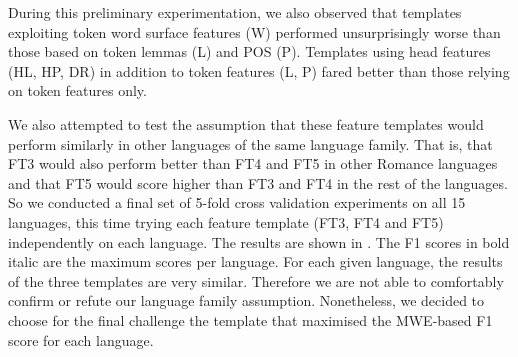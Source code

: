 \documentclass[output=paper,modfonts,nonflat]{langsci/langscibook}
\begin{document}
During this preliminary experimentation, we also observed that templates exploiting token
word surface features (W) performed unsurprisingly worse than those
based on token lemmas (L) and POS (P). Templates using head features
(HL, HP, DR) in addition to token features (L, P) fared better than
those relying on token features only. 

 
We also attempted to test the assumption that these feature templates would perform similarly in other languages of the same language family. That is, that FT3 would also perform better than FT4 and FT5 in other Romance languages and that FT5 would score higher than FT3 and FT4 in the rest of the languages. So we conducted a final set of 5-fold cross validation experiments on all 15 languages, this time trying each feature template (FT3, FT4 and FT5) independently on each language. The results are shown in . The F1 scores in bold italic are the maximum scores per language. For each given language, the results of the three templates are very similar. Therefore we are not able to comfortably confirm or refute our language family assumption. Nonetheless, we decided to choose for the final challenge the template that maximised the MWE-based F1 score for each language.
 
\end{document}
